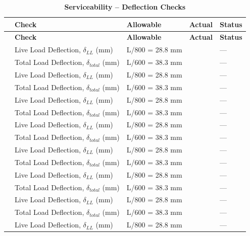 \documentclass[12pt,a4paper]{report}
\numberwithin{table}{chapter}
\numberwithin{figure}{chapter}
\begin{document}
\vspace{1em}
\begin{longtable}{|C{2.5cm}|L{3.5cm}|C{3.5cm}|>{\centering\arraybackslash}p{3.5cm}|C{2.5cm}|}
\caption{\textbf{Serviceability -- Deflection Checks}}
\hline
\textbf{} & \textbf{Check} & \textbf{Allowable} & \textbf{Actual} & \textbf{Status} \\[6pt]
\hline
\endfirsthead
\hline
\textbf{} & \textbf{Check} & \textbf{Allowable} & \textbf{Actual} & \textbf{Status} \\[6pt]
\hline
\endhead
{} & Live Load Deflection, $\delta_{LL}$ (mm) & L/800 = 28.8 mm &  & --- \\[6pt]
 & Total Load Deflection, $\delta_{total}$ (mm) & L/600 = 38.3 mm &  & --- \\[6pt]
\hline
{} & Live Load Deflection, $\delta_{LL}$ (mm) & L/800 = 28.8 mm &  & --- \\[6pt]
 & Total Load Deflection, $\delta_{total}$ (mm) & L/600 = 38.3 mm &  & --- \\[6pt]
\hline
{} & Live Load Deflection, $\delta_{LL}$ (mm) & L/800 = 28.8 mm &  & --- \\[6pt]
 & Total Load Deflection, $\delta_{total}$ (mm) & L/600 = 38.3 mm &  & --- \\[6pt]
\hline
{} & Live Load Deflection, $\delta_{LL}$ (mm) & L/800 = 28.8 mm &  & --- \\[6pt]
 & Total Load Deflection, $\delta_{total}$ (mm) & L/600 = 38.3 mm &  & --- \\[6pt]
\hline
{} & Live Load Deflection, $\delta_{LL}$ (mm) & L/800 = 28.8 mm &  & --- \\[6pt]
 & Total Load Deflection, $\delta_{total}$ (mm) & L/600 = 38.3 mm &  & --- \\[6pt]
\hline
{} & Live Load Deflection, $\delta_{LL}$ (mm) & L/800 = 28.8 mm &  & --- \\[6pt]
 & Total Load Deflection, $\delta_{total}$ (mm) & L/600 = 38.3 mm &  & --- \\[6pt]
\hline
{} & Live Load Deflection, $\delta_{LL}$ (mm) & L/800 = 28.8 mm &  & --- \\[6pt]
 & Total Load Deflection, $\delta_{total}$ (mm) & L/600 = 38.3 mm &  & --- \\[6pt]
\hline
{} & Live Load Deflection, $\delta_{LL}$ (mm) & L/800 = 28.8 mm &  & --- \\[6pt]

\end{longtable}
\end{document}
